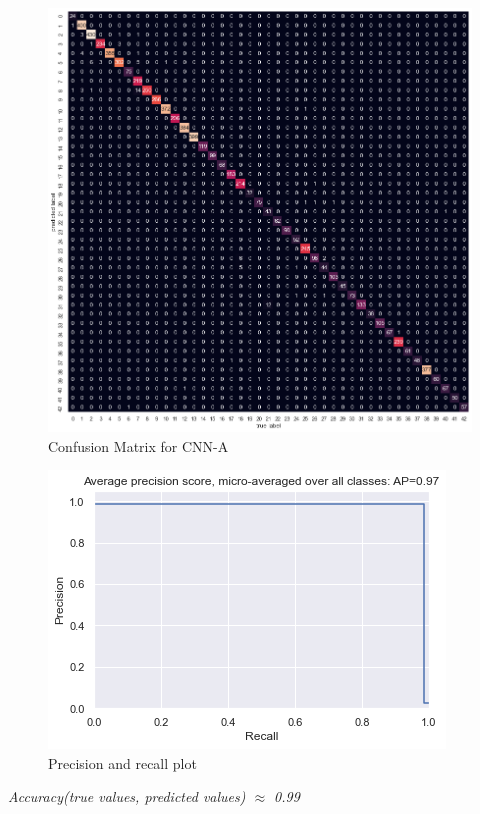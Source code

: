 \documentclass[12pt, landscape]{article}
\begin{document}
\begin{multicols}{3}
\begin{figure}[H]
    \centerline{\includegraphics[scale = 0.4]{confmat.png}}
    \caption{Confusion Matrix for CNN-A}
    \label{fig:CNNAconusionmatrix}
\end{figure}

\begin{figure}[H]
    \centerline{\includegraphics[scale = 0.6]{precisionrecall.png}}
    \caption{Precision and recall plot}
    \label{fig:CNNAprecrec}
\end{figure}

\begin{center}
\emph{Accuracy(true values, predicted values) $\approx$ 0.99}


\end{center}
\end{multicols}
\end{document}

